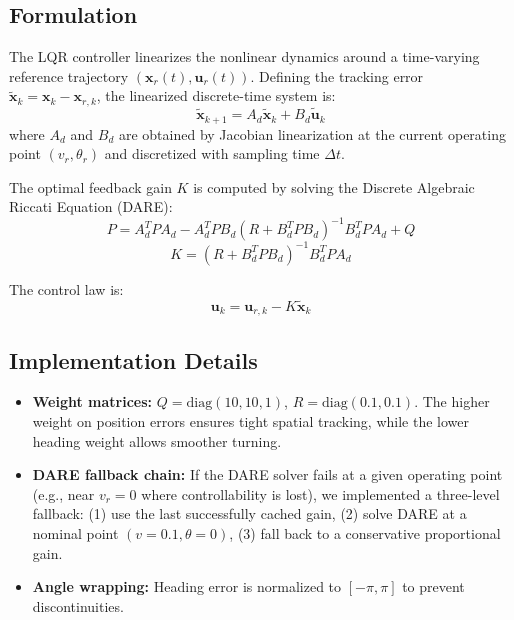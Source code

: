 \documentclass[12pt, a4paper]{article}
\begin{document}
\subsection{Formulation}
The LQR controller linearizes the nonlinear dynamics around a time-varying reference trajectory $(\mathbf{x}_r(t), \mathbf{u}_r(t))$. Defining the tracking error $\tilde{\mathbf{x}}_k = \mathbf{x}_k - \mathbf{x}_{r,k}$, the linearized discrete-time system is:
\begin{equation}
    \tilde{\mathbf{x}}_{k+1} = A_d \tilde{\mathbf{x}}_k + B_d \tilde{\mathbf{u}}_k
\end{equation}
where $A_d$ and $B_d$ are obtained by Jacobian linearization at the current operating point $(v_r, \theta_r)$ and discretized with sampling time $\Delta t$.

The optimal feedback gain $K$ is computed by solving the Discrete Algebraic Riccati Equation (DARE):
\begin{equation}
    P = A_d^T P A_d - A_d^T P B_d (R + B_d^T P B_d)^{-1} B_d^T P A_d + Q
\end{equation}
\begin{equation}
    K = (R + B_d^T P B_d)^{-1} B_d^T P A_d
\end{equation}

The control law is:
\begin{equation}
    \mathbf{u}_k = \mathbf{u}_{r,k} - K \tilde{\mathbf{x}}_k
\end{equation}

\subsection{Implementation Details}
\begin{itemize}
    \item \textbf{Weight matrices:} $Q = \text{diag}(10, 10, 1)$, $R = \text{diag}(0.1, 0.1)$. The higher weight on position errors ensures tight spatial tracking, while the lower heading weight allows smoother turning.
    \item \textbf{DARE fallback chain:} If the DARE solver fails at a given operating point (e.g., near $v_r = 0$ where controllability is lost), we implemented a three-level fallback: (1) use the last successfully cached gain, (2) solve DARE at a nominal point $(v=0.1, \theta=0)$, (3) fall back to a conservative proportional gain.
    \item \textbf{Angle wrapping:} Heading error is normalized to $[-\pi, \pi]$ to prevent discontinuities.
\end{itemize}
\end{document}
